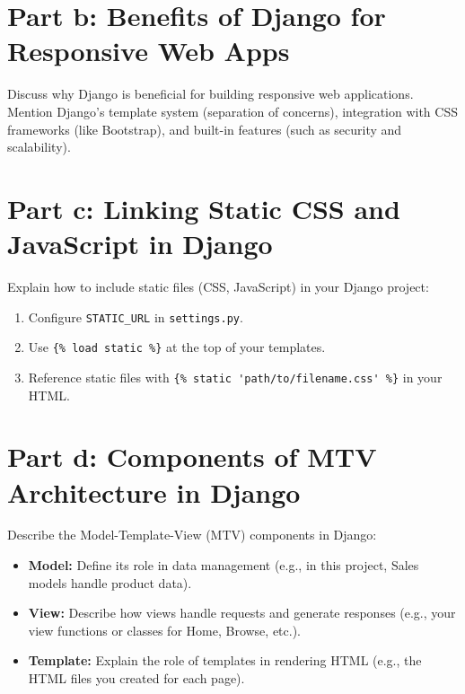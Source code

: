 \documentclass[12pt]{article}
\begin{document}
\section{Part b: Benefits of Django for Responsive Web Apps}
Discuss why Django is beneficial for building responsive web applications. Mention Django’s template system (separation of concerns), integration with CSS frameworks (like Bootstrap), and built-in features (such as security and scalability).

\section{Part c: Linking Static CSS and JavaScript in Django}
Explain how to include static files (CSS, JavaScript) in your Django project:
\begin{enumerate}
    \item Configure \texttt{STATIC\_URL} in \texttt{settings.py}.
    \item Use \verb|{% load static %}| at the top of your templates.
    \item Reference static files with \verb|{% static 'path/to/filename.css' %}| in your HTML.
\end{enumerate}

\section{Part d: Components of MTV Architecture in Django}
Describe the Model-Template-View (MTV) components in Django:
\begin{itemize}
    \item \textbf{Model:} Define its role in data management (e.g., in this project, Sales models handle product data).
    \item \textbf{View:} Describe how views handle requests and generate responses (e.g., your view functions or classes for Home, Browse, etc.).
    \item \textbf{Template:} Explain the role of templates in rendering HTML (e.g., the HTML files you created for each page).
\end{itemize}
\end{document}
